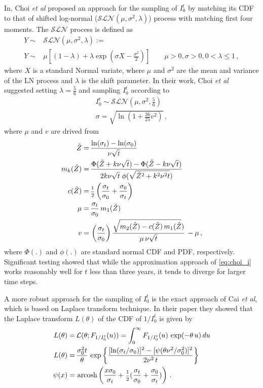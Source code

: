 \documentclass[12pt,oneside]{article}
\newcommand{\beqn}{\begin{equation}}
\newcommand{\eeqn}{\end{equation}}
\newcommand{\half}{\text{\scriptsize\ensuremath{\frac{1}{2}}}}
\numberwithin{equation}{section}
\DeclareMathOperator*{\arcosh}{arcosh}
\begin{document}
In\cite{CHK}, Choi {\em et al} proposed an approach for the sampling of $I_0^t$
by matching its CDF to that of shifted log-normal ($\mathcal{SLN}(\mu,\sigma^2,\lambda)$)
process with matching
first four moments.
The $\mathcal{SLN}$ process is defined as
\beqn
\begin{split}
Y\sim&\mathcal{SLN}(\mu,\sigma^2,\lambda) :=\\
Y\sim& \mu\left[(1-\lambda)+
\lambda\exp(\sigma X-\frac{\sigma^2}{2})\right]\quad\quad\mu>0,\sigma>0,0<\lambda\le 1\,, 
\end{split}
\eeqn
where $X$ is a standard Normal variate, where $\mu$ and $\sigma^2$ are the
mean and variance of the LN process and $\lambda$
is the shift parameter.
In their work,
Choi {\em et al} suggested setting $\lambda=\frac{5}{6}$ and sampling $I_0^t$
according to
\beqn\label{eq:choi_i}
\begin{aligned}
I_0^t\sim\mathcal{SLN}\left(\mu,\sigma^2,\frac{5}{6}\right)\\
\sigma = \sqrt{\ln\left(1+\frac{36}{25}v^2\right)}\,,
\end{aligned}
\eeqn
where $\mu$ and $v$ are drived from
\beqn
\begin{aligned}
    \hat{Z}=&\,\frac{\ln(\sigma_t)-\ln(\sigma_0)}{\nu\sqrt{t}}\\
    m_k(\hat{Z}) = &\,\frac{\Phi(\hat{Z}+k\nu\sqrt{t})-\Phi(\hat{Z}-k\nu\sqrt{t})}
    {2k\nu\sqrt{t}\;\phi(\sqrt{\hat{Z}^2+k^2\nu^2t})}\\
    c(\hat{Z})=&\,\half\left(\frac{\sigma_t}{\sigma_0}+\frac{\sigma_0}{\sigma_t}\right)\\
    \mu = &\,\frac{\sigma_t}{\sigma_0}\,m_1(\hat{Z})\\
    v=&\,\left(\frac{\sigma_t}{\sigma_0}\right)
    \frac{\sqrt{m_2(\hat{Z})-c(\hat{Z})\,m_1(\hat{Z}})}{\mu\,\nu\sqrt{t}}
    \,-\mu\,,
\end{aligned}
\eeqn
where $\Phi(.)$ and $\phi(.)$ are standard normal CDF and PDF, respectively.
Significant testing showed that while the approximation approach of \eqref{eq:choi_i}
works reasonably well for $t$ less than three years,
it tends to diverge for larger time steps.

A more robust approach for the sampling of $I_0^t$ is the exact approach of Cai {\em et al}\cite{CSC},
which is based on Laplace transform technique.
In their paper they showed that the Laplace transform $L(\theta)$ of the CDF of $1/I_0^t$ is given by
\beqn\label{eq:laplace}
\begin{aligned}
    L(\theta)=\,&\mathcal{L}(\theta;F_{1/I_0^t}(u))=\int_0^\infty F_{1/I_0^t}(u)\,\exp(-\theta\,u)\,du\\
    L(\theta)=\,&\frac{\sigma_0^2t}{\theta}\,\exp\left\{\frac{[\ln(\sigma_t/\sigma_0)]^2-[\psi(\theta\nu^2/\sigma_0^2)]^2}{2\nu^2\,t}\right\}\\
    \psi(x)=\,&\arcosh\left(\frac{x\sigma_0}{\sigma_t}+\half(\frac{\sigma_t}{\sigma_0}+\frac{\sigma_0}{\sigma_t})\right)\,.
\end{aligned}
\eeqn
\end{document}
